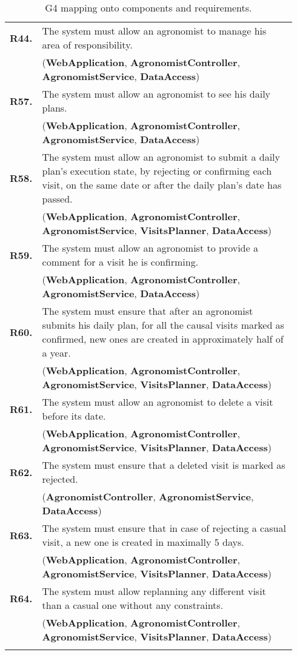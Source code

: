 \begin{longtable}{p{0.06\linewidth} p{0.88\linewidth}}
	\textbf{R44.} & The system must allow an agronomist to manage his area of responsibility.\\
	& (\textbf{WebApplication}, \textbf{AgronomistController}, \textbf{AgronomistService}, \textbf{DataAccess})\\
	\textbf{R57.} & The system must allow an agronomist to see his daily plans.\\
	& (\textbf{WebApplication}, \textbf{AgronomistController}, \textbf{AgronomistService}, \textbf{DataAccess})\\
	\textbf{R58.} & The system must allow an agronomist to submit a daily plan's execution state, by rejecting or confirming each visit, on the same date or after the daily plan's date has passed. \\
	& (\textbf{WebApplication}, \textbf{AgronomistController}, \textbf{AgronomistService}, \textbf{VisitsPlanner}, \textbf{DataAccess})\\
	\textbf{R59.} & The system must allow an agronomist to provide a comment for a visit he is confirming.\\
	& (\textbf{WebApplication}, \textbf{AgronomistController}, \textbf{AgronomistService}, \textbf{DataAccess})\\
	
	\textbf{R60.} & The system must ensure that after an agronomist submits his daily plan, for all the causal visits marked as confirmed, new ones are created in approximately half of a year.\\
	& (\textbf{WebApplication}, \textbf{AgronomistController}, \textbf{AgronomistService}, \textbf{VisitsPlanner}, \textbf{DataAccess})\\
	\textbf{R61.} & The system must allow an agronomist to delete a visit before its date.\\
	& (\textbf{WebApplication}, \textbf{AgronomistController}, \textbf{AgronomistService}, \textbf{VisitsPlanner}, \textbf{DataAccess})\\
	\textbf{R62.} & The system must ensure that a deleted visit is marked as rejected.\\
	& (\textbf{AgronomistController}, \textbf{AgronomistService}, \textbf{DataAccess})\\
	\textbf{R63.} & The system must ensure that in case of rejecting a casual visit, a new one is created in maximally 5 days.\\
	& (\textbf{WebApplication}, \textbf{AgronomistController}, \textbf{AgronomistService}, \textbf{VisitsPlanner}, \textbf{DataAccess})\\
	\textbf{R64.} & The system must allow replanning any different visit than a casual one without any constraints.\\
	& (\textbf{WebApplication}, \textbf{AgronomistController}, \textbf{AgronomistService}, \textbf{VisitsPlanner}, \textbf{DataAccess})\\
    
    \bottomrule
    \caption{G4 mapping onto components and requirements.}
\end{longtable}
    

